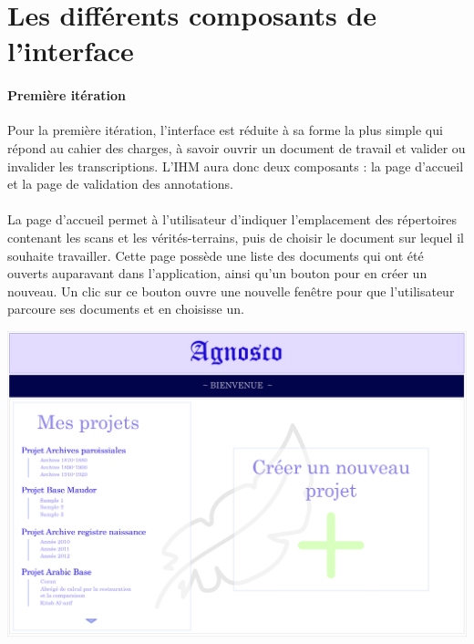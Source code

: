 \section{Les différents composants de l'interface}

\paragraph{Première itération}
Pour la première itération, l’interface est réduite à sa forme la plus simple qui répond au cahier des charges, à savoir ouvrir un document de travail et valider ou invalider les transcriptions. L’IHM aura donc deux composants : la page d’accueil et la page de validation des annotations.

\paragraph{}
La page d’accueil permet à l’utilisateur d’indiquer l’emplacement des répertoires contenant les scans et les vérités-terrains, puis de choisir le document sur lequel il souhaite travailler. Cette page possède une liste des documents qui ont été ouverts auparavant dans l’application, ainsi qu’un bouton pour en créer un nouveau. Un clic sur ce bouton ouvre une nouvelle fenêtre pour que l’utilisateur parcoure ses documents et en choisisse un.

\newpage{}
\begin{mdframed}[frametitle={Figure 1 : Maquette de la page d'accueil de l'IHM}, innerbottommargin=10]
\begin{center}
\includegraphics[scale=0.04]{assets/maquetteIHMaccueil.jpg}
\end{center}
\end{mdframed}

